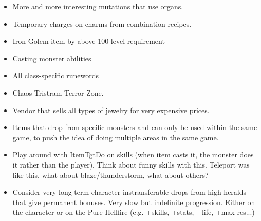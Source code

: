\documentclass[12pt,a4paper]{article}
\begin{document}
\begin{itemize}
\item More and more interesting mutations that use organs.
\item Temporary charges on charms from combination recipes.
\item Iron Golem item by above 100 level requirement
\item Casting monster abilities
\item All class-specific runewords
\item Chaos Tristram Terror Zone.
\item Vendor that sells all types of jewelry for very expensive prices.
\item Items that drop from specific monsters and can only be used within the same game, to push the idea of doing multiple areas in the same game.
\item Play around with ItemTgtDo on skills (when item casts it, the monster does it rather than the player). Think about funny skills with this. Teleport was like this, what about blaze/thunderstorm, what about others?
\item Consider very long term character-instransferable drops from high heralds that give permanent bonuses. Very slow but indefinite progression. Either on the character or on the Pure Hellfire (e.g. +skills, +stats, +life, +max res...)

\end{itemize}
\end{document}
